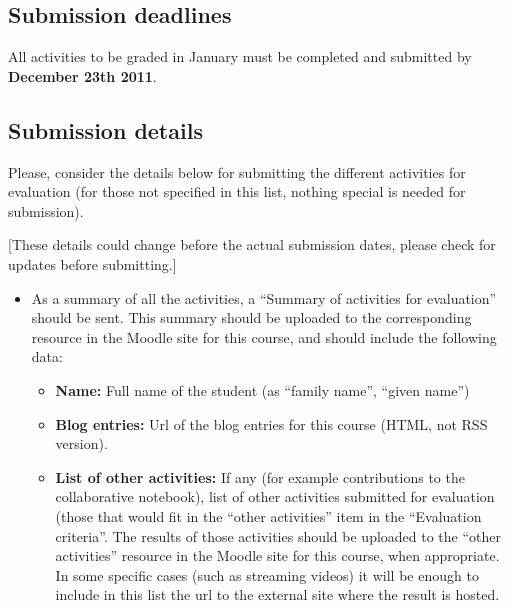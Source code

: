 \documentclass[a4paper]{article}
\begin{document}
\subsection{Submission deadlines}

All activities to be graded in January must be completed and submitted by \textbf{December 23th 2011}.

\subsection{Submission details}

Please, consider the details below for submitting the different activities for evaluation (for those not specified in this list, nothing special is needed for submission).

[These details could change before the actual submission dates, please check for updates before submitting.]

\begin{itemize}
\item As a summary of all the activities, a ``Summary of activities for evaluation'' should be sent. This summary should be uploaded to the corresponding resource in the Moodle site for this course, and should include the following data:
  \begin{itemize}
  \item \textbf{Name:} Full name of the student (as ``family name'', ``given name'')
  \item \textbf{Blog entries:} Url of the blog entries for this course (HTML, not RSS version).
  \item \textbf{List of other activities:} If any (for example contributions to the collaborative notebook), list of other activities submitted for evaluation (those that would fit in the ``other activities'' item in the ``Evaluation criteria''. The results of those activities should be uploaded to the ``other activities'' resource in the Moodle site for this course, when appropriate. In some specific cases (such as streaming videos) it will be enough to include in this list the url to the external site where the result is hosted.
  \end{itemize}
\end{itemize}
\end{document}
